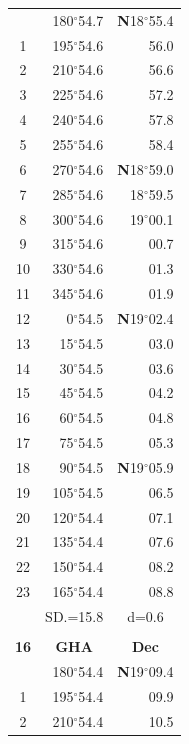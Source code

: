 \documentclass[10pt, a4paper]{report}
\begin{document}
\begin{scriptsize}
\begin{tabular*}{0.2\textwidth}[t]{@{\extracolsep{\fill}}|c|rr|}
\hline\rule{0pt}{2.6ex}\noindent
0 & 180$^\circ$54.7 & \textbf{N}18$^\circ$55.4\\
1 & 195$^\circ$54.6 & 56.0\\
2 & 210$^\circ$54.6 & 56.6\\
3 & 225$^\circ$54.6 & \raisebox{0.24ex}{\boldmath$\cdot$~\boldmath$\cdot$~~}57.2\\
4 & 240$^\circ$54.6 & 57.8\\
5 & 255$^\circ$54.6 & 58.4\\[2Pt]
6 & 270$^\circ$54.6 & \textbf{N}18$^\circ$59.0\\
7 & 285$^\circ$54.6 & 18$^\circ$59.5\\
8 & 300$^\circ$54.6 & 19$^\circ$00.1\\
9 & 315$^\circ$54.6 & \raisebox{0.24ex}{\boldmath$\cdot$~\boldmath$\cdot$~~}00.7\\
10 & 330$^\circ$54.6 & 01.3\\
11 & 345$^\circ$54.6 & 01.9\\[2Pt]
12 & 0$^\circ$54.5 & \textbf{N}19$^\circ$02.4\\
13 & 15$^\circ$54.5 & 03.0\\
14 & 30$^\circ$54.5 & 03.6\\
15 & 45$^\circ$54.5 & \raisebox{0.24ex}{\boldmath$\cdot$~\boldmath$\cdot$~~}04.2\\
16 & 60$^\circ$54.5 & 04.8\\
17 & 75$^\circ$54.5 & 05.3\\[2Pt]
18 & 90$^\circ$54.5 & \textbf{N}19$^\circ$05.9\\
19 & 105$^\circ$54.5 & 06.5\\
20 & 120$^\circ$54.4 & 07.1\\
21 & 135$^\circ$54.4 & \raisebox{0.24ex}{\boldmath$\cdot$~\boldmath$\cdot$~~}07.6\\
22 & 150$^\circ$54.4 & 08.2\\
23 & 165$^\circ$54.4 & 08.8\\
\hline
\rule{0pt}{2.4ex} & \multicolumn{1}{c}{SD.=15.8} & \multicolumn{1}{c|}{d=0.6}\\
\hline
\multicolumn{1}{c}{}\\[-0.5ex]\hline
\multicolumn{1}{|c|}{\rule{0pt}{2.6ex}\textbf{16}} & \multicolumn{1}{c}{\textbf{GHA}} & \multicolumn{1}{c|}{\textbf{Dec}}\\
\hline\rule{0pt}{2.6ex}\noindent
0 & 180$^\circ$54.4 & \textbf{N}19$^\circ$09.4\\
1 & 195$^\circ$54.4 & 09.9\\
2 & 210$^\circ$54.4 & 10.5\\

\end{tabular*}
\end{scriptsize}
\end{document}
